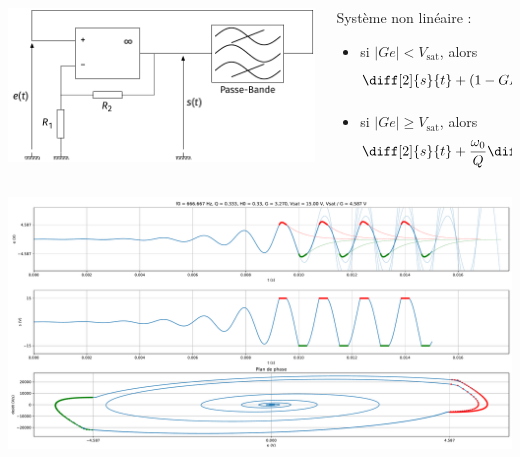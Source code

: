 \documentclass[10pt,aspectratio=169]{beamer}
\begin{document}
\begin{frame}
  \begin{columns}
    \begin{column}{.5\linewidth}
    \includegraphics[width = \linewidth]{schema-oscillateur-QS-boucle}
  \end{column}
  \begin{column}{.5\linewidth}
    Système non linéaire :
    \begin{itemize}
    \item si $|G e| < V_{\mathrm{sat}}$, alors $$\diff[2]{s}{t} + (1 - G H_0) \frac{\omega_0}{Q} \diff{s}{t} + \omega_0^2 s = 0 ;$$
    \item si $|G e| \geqslant V_{\mathrm{sat}}$, alors $$\diff[2]{s}{t} + \frac{\omega_0}{Q} \diff{s}{t} + \omega_0^2 s = 0.$$
    \end{itemize}

  \end{column}
\end{columns}
\end{frame}

\begin{frame}
  \centering\includegraphics[height = .9\textheight]{plot-oscillateur-QS-python}
\end{frame}
\end{document}
